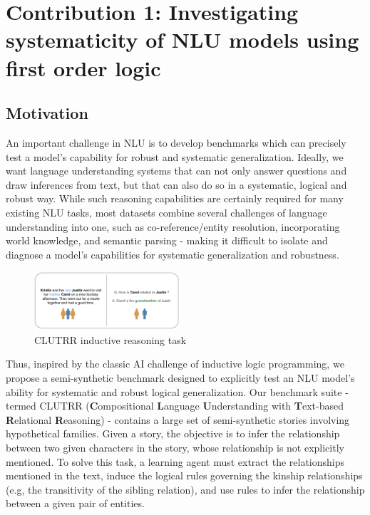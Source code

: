 \documentclass[12pt]{article}
\begin{document}
\section{Contribution 1: Investigating systematicity of NLU models using first order logic}
\label{sec:cont1}

\subsection{Motivation}

An important challenge in NLU is to develop benchmarks which can precisely test a model's capability for robust and systematic generalization. Ideally, we want language understanding systems that can not only answer questions and draw inferences from text, but that can also do so in a systematic, logical and robust way. While such reasoning capabilities are certainly required for many existing NLU tasks, most datasets combine several challenges of language understanding into one, such as co-reference/entity resolution, incorporating world knowledge, and semantic parsing - making it difficult to isolate and diagnose a model's capabilities for systematic generalization and robustness.

\begin{figure}
\begin{center}
  \includegraphics[width=0.48\textwidth]{images/clutrr_text.png}
\end{center}
\caption{CLUTRR inductive reasoning task}
\label{fig:clutrr_data}
\end{figure}



Thus, inspired by the classic AI challenge of inductive logic programming, we propose a semi-synthetic benchmark designed to explicitly test an NLU model's ability for systematic and robust logical generalization. Our benchmark suite - termed CLUTRR (\textbf{C}ompositional \textbf{L}anguage \textbf{U}nderstanding with \textbf{T}ext-based \textbf{R}elational \textbf{R}easoning) - contains a large set of semi-synthetic stories involving hypothetical families. Given a story, the objective is to infer the relationship between two given characters in the story, whose relationship is not explicitly mentioned. To solve this task, a learning agent must extract the relationships mentioned in the text, induce the logical rules governing the kinship relationships (e.g, the transitivity of the sibling relation), and use rules to infer the relationship between a given pair of entities.
\end{document}
